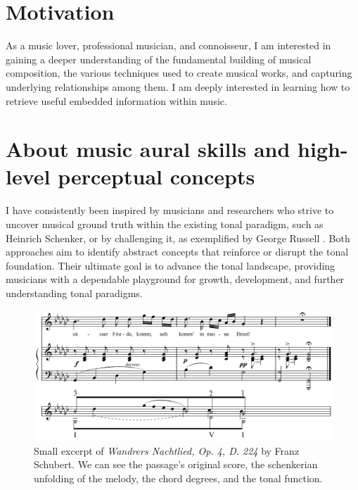 \section{Motivation}
As a music lover, professional musician, and connoisseur, I am interested in gaining a deeper understanding of the fundamental building of musical composition, the various techniques used to create musical works, and capturing underlying relationships among them. I am deeply interested in learning how to retrieve useful embedded information within music. 

\section{About music aural skills and high-level perceptual concepts}

I have consistently been inspired by musicians and researchers who strive to uncover musical ground truth within the existing tonal paradigm, such as Heinrich Schenker, or by challenging it, as exemplified by George Russell \cite{LydianRussell}. Both approaches aim to identify abstract concepts that reinforce or disrupt the tonal foundation. Their ultimate goal is to advance the tonal landscape, providing musicians with a dependable playground for growth, development, and further understanding tonal paradigms.


\begin{figure}[ht]
\includegraphics[clip,width=\columnwidth]{figures/schenkerian analysis/SchubertOp4no3.png}%
\caption{Small excerpt of \textit{Wandrers Nachtlied, Op. 4, D. 224} by Franz Schubert. We can see the passage's original score, the schenkerian unfolding of the melody, the chord degrees, and the tonal function.}
\label{fig:Wandrers Nachtlied, Op. 4, D. 224}
\end{figure}


